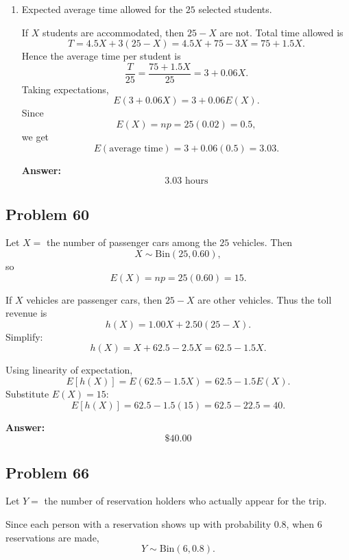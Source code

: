 \documentclass[11pt]{article}
\begin{document}
\begin{enumerate}
    \textbf{Answer:}
    \[
    \boxed{0.9114}
    \]

    \item[(e)] Expected average time allowed for the \(25\) selected students.

    If \(X\) students are accommodated, then \(25-X\) are not.  
    Total time allowed is
    \[
    T=4.5X+3(25-X)=4.5X+75-3X=75+1.5X.
    \]
    Hence the average time per student is
    \[
    \frac{T}{25}=\frac{75+1.5X}{25}=3+0.06X.
    \]
    Taking expectations,
    \[
    E\!\left(3+0.06X\right)=3+0.06E(X).
    \]
    Since
    \[
    E(X)=np=25(0.02)=0.5,
    \]
    we get
    \[
    E(\text{average time})=3+0.06(0.5)=3.03.
    \]

    \textbf{Answer:}
    \[
    \boxed{3.03 \text{ hours}}
    \]
\end{enumerate}

\subsection*{Problem 60}

Let \(X=\) the number of passenger cars among the \(25\) vehicles. Then
\[
X\sim \mathrm{Bin}(25,0.60),
\]
so
\[
E(X)=np=25(0.60)=15.
\]

If \(X\) vehicles are passenger cars, then \(25-X\) are other vehicles.  
Thus the toll revenue is
\[
h(X)=1.00X+2.50(25-X).
\]
Simplify:
\[
h(X)=X+62.5-2.5X=62.5-1.5X.
\]

Using linearity of expectation,
\[
E[h(X)]=E(62.5-1.5X)=62.5-1.5E(X).
\]
Substitute \(E(X)=15\):
\[
E[h(X)]=62.5-1.5(15)=62.5-22.5=40.
\]

\textbf{Answer:}
\[
\boxed{\$40.00}
\]

\subsection*{Problem 66}

Let \(Y=\) the number of reservation holders who actually appear for the trip.

Since each person with a reservation shows up with probability \(0.8\), when \(6\) reservations are made,
\[
Y\sim \mathrm{Bin}(6,0.8).
\]
\end{document}
